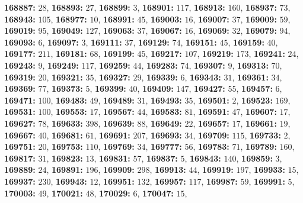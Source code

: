 \textsf{\bfseries 168887:} $28$, \textsf{\bfseries 168893:} $27$, \textsf{\bfseries 168899:} $3$, \textsf{\bfseries 168901:} $117$, \textsf{\bfseries 168913:} $160$, \textsf{\bfseries 168937:} $73$, \textsf{\bfseries 168943:} $105$, \textsf{\bfseries 168977:} $10$, \textsf{\bfseries 168991:} $45$, \textsf{\bfseries 169003:} $16$, \textsf{\bfseries 169007:} $37$, \textsf{\bfseries 169009:} $59$, \textsf{\bfseries 169019:} $95$, \textsf{\bfseries 169049:} $127$, \textsf{\bfseries 169063:} $37$, \textsf{\bfseries 169067:} $16$, \textsf{\bfseries 169069:} $32$, \textsf{\bfseries 169079:} $94$, \textsf{\bfseries 169093:} $6$, \textsf{\bfseries 169097:} $3$, \textsf{\bfseries 169111:} $37$, \textsf{\bfseries 169129:} $74$, \textsf{\bfseries 169151:} $45$, \textsf{\bfseries 169159:} $40$, \textsf{\bfseries 169177:} $211$, \textsf{\bfseries 169181:} $68$, \textsf{\bfseries 169199:} $45$, \textsf{\bfseries 169217:} $107$, \textsf{\bfseries 169219:} $173$, \textsf{\bfseries 169241:} $24$, \textsf{\bfseries 169243:} $9$, \textsf{\bfseries 169249:} $117$, \textsf{\bfseries 169259:} $44$, \textsf{\bfseries 169283:} $74$, \textsf{\bfseries 169307:} $9$, \textsf{\bfseries 169313:} $70$, \textsf{\bfseries 169319:} $20$, \textsf{\bfseries 169321:} $35$, \textsf{\bfseries 169327:} $29$, \textsf{\bfseries 169339:} $6$, \textsf{\bfseries 169343:} $31$, \textsf{\bfseries 169361:} $34$, \textsf{\bfseries 169369:} $77$, \textsf{\bfseries 169373:} $5$, \textsf{\bfseries 169399:} $40$, \textsf{\bfseries 169409:} $147$, \textsf{\bfseries 169427:} $55$, \textsf{\bfseries 169457:} $6$, \textsf{\bfseries 169471:} $100$, \textsf{\bfseries 169483:} $49$, \textsf{\bfseries 169489:} $31$, \textsf{\bfseries 169493:} $35$, \textsf{\bfseries 169501:} $2$, \textsf{\bfseries 169523:} $169$, \textsf{\bfseries 169531:} $100$, \textsf{\bfseries 169553:} $17$, \textsf{\bfseries 169567:} $44$, \textsf{\bfseries 169583:} $81$, \textsf{\bfseries 169591:} $47$, \textsf{\bfseries 169607:} $17$, \textsf{\bfseries 169627:} $78$, \textsf{\bfseries 169633:} $398$, \textsf{\bfseries 169639:} $88$, \textsf{\bfseries 169649:} $22$, \textsf{\bfseries 169657:} $17$, \textsf{\bfseries 169661:} $19$, \textsf{\bfseries 169667:} $40$, \textsf{\bfseries 169681:} $61$, \textsf{\bfseries 169691:} $207$, \textsf{\bfseries 169693:} $34$, \textsf{\bfseries 169709:} $115$, \textsf{\bfseries 169733:} $2$, \textsf{\bfseries 169751:} $20$, \textsf{\bfseries 169753:} $110$, \textsf{\bfseries 169769:} $34$, \textsf{\bfseries 169777:} $56$, \textsf{\bfseries 169783:} $71$, \textsf{\bfseries 169789:} $160$, \textsf{\bfseries 169817:} $31$, \textsf{\bfseries 169823:} $13$, \textsf{\bfseries 169831:} $57$, \textsf{\bfseries 169837:} $5$, \textsf{\bfseries 169843:} $140$, \textsf{\bfseries 169859:} $3$, \textsf{\bfseries 169889:} $24$, \textsf{\bfseries 169891:} $196$, \textsf{\bfseries 169909:} $298$, \textsf{\bfseries 169913:} $44$, \textsf{\bfseries 169919:} $197$, \textsf{\bfseries 169933:} $15$, \textsf{\bfseries 169937:} $230$, \textsf{\bfseries 169943:} $12$, \textsf{\bfseries 169951:} $132$, \textsf{\bfseries 169957:} $117$, \textsf{\bfseries 169987:} $59$, \textsf{\bfseries 169991:} $5$, \textsf{\bfseries 170003:} $49$, \textsf{\bfseries 170021:} $48$, \textsf{\bfseries 170029:} $6$, \textsf{\bfseries 170047:} $15$, 
